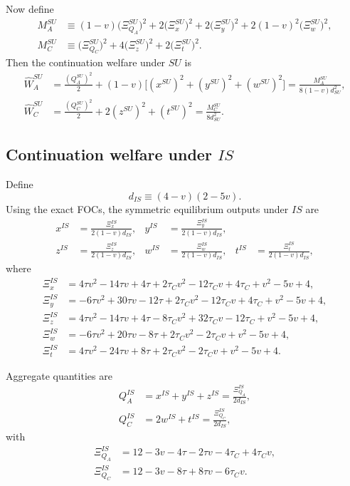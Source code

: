 Now define
\begin{align}
M_A^{SU}
&\equiv
(1-v)\big(\Xi_{Q_A}^{SU}\big)^2
+2\big(\Xi_x^{SU}\big)^2
+2\big(\Xi_y^{SU}\big)^2
+2(1-v)^2\big(\Xi_w^{SU}\big)^2, \label{eq:MA_su}\\
M_C^{SU}
&\equiv
\big(\Xi_{Q_C}^{SU}\big)^2
+4\big(\Xi_z^{SU}\big)^2
+2\big(\Xi_t^{SU}\big)^2. \label{eq:MC_su}
\end{align}
Then the continuation welfare under $SU$ is
\begin{align}
\widehat W_A^{SU}
&=
\frac{(Q_A^{SU})^2}{2}
+
(1-v)\Big[(x^{SU})^2+(y^{SU})^2+(w^{SU})^2\Big]
=
\frac{M_A^{SU}}{8(1-v)d_{SU}^2}, \label{eq:WA_su_appendix}\\
\widehat W_C^{SU}
&=
\frac{(Q_C^{SU})^2}{2}
+
2(z^{SU})^2+(t^{SU})^2
=
\frac{M_C^{SU}}{8d_{SU}^2}. \label{eq:WC_su_appendix}
\end{align}

\subsection{Continuation welfare under \texorpdfstring{$IS$}{IS}}

Define
\[
d_{IS}\equiv (4-v)(2-5v).
\]
Using the exact FOCs, the symmetric equilibrium outputs under $IS$ are
\begin{align}
x^{IS} &= \frac{\Xi_x^{IS}}{2(1-v)d_{IS}}, &
y^{IS} &= \frac{\Xi_y^{IS}}{2(1-v)d_{IS}}, \label{eq:is_outputs1_appendix}\\
z^{IS} &= \frac{\Xi_z^{IS}}{2(1-v)d_{IS}}, &
w^{IS} &= \frac{\Xi_w^{IS}}{2(1-v)d_{IS}}, &
t^{IS} &= \frac{\Xi_t^{IS}}{2(1-v)d_{IS}}, \label{eq:is_outputs2_appendix}
\end{align}
where
\begin{align}
\Xi_x^{IS}
&= 4\tau v^2-14\tau v+4\tau
+2\tau_C v^2-12\tau_C v+4\tau_C
+v^2-5v+4, \label{eq:Xix_is}\\
\Xi_y^{IS}
&= -6\tau v^2+30\tau v-12\tau
+2\tau_C v^2-12\tau_C v+4\tau_C
+v^2-5v+4, \label{eq:Xiy_is}\\
\Xi_z^{IS}
&= 4\tau v^2-14\tau v+4\tau
-8\tau_C v^2+32\tau_C v-12\tau_C
+v^2-5v+4, \label{eq:Xiz_is}\\
\Xi_w^{IS}
&= -6\tau v^2+20\tau v-8\tau
+2\tau_C v^2-2\tau_C v
+v^2-5v+4, \label{eq:Xiw_is}\\
\Xi_t^{IS}
&= 4\tau v^2-24\tau v+8\tau
+2\tau_C v^2-2\tau_C v
+v^2-5v+4. \label{eq:Xit_is}
\end{align}

Aggregate quantities are
\begin{align}
Q_A^{IS}
&= x^{IS}+y^{IS}+z^{IS}
= \frac{\Xi_{Q_A}^{IS}}{2d_{IS}}, \label{eq:QA_is_appendix}\\
Q_C^{IS}
&= 2w^{IS}+t^{IS}
= \frac{\Xi_{Q_C}^{IS}}{2d_{IS}}, \label{eq:QC_is_appendix}
\end{align}
with
\begin{align}
\Xi_{Q_A}^{IS}
&= 12-3v-4\tau-2\tau v-4\tau_C+4\tau_C v, \label{eq:XiQA_is}\\
\Xi_{Q_C}^{IS}
&= 12-3v-8\tau+8\tau v-6\tau_C v. \label{eq:XiQC_is}
\end{align}


